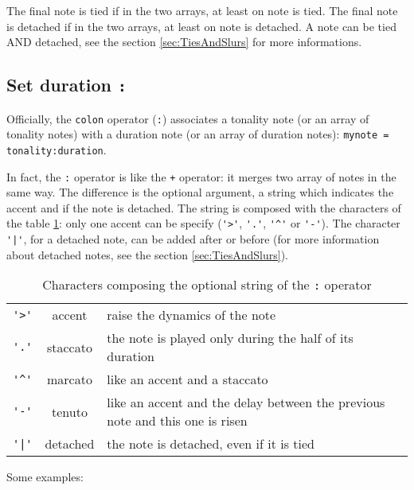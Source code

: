 \documentclass{article}
\begin{document}
The final note is tied if in the two arrays, at least on note is tied. The final note is detached if in the two arrays, at least on note is detached. A note can be tied AND detached, see the section \ref{sec:TiesAndSlurs} for more informations.

\subsection{Set duration \lstinline!:!}
\label{sec:SetDuration}

Officially, the \lstinline!colon! operator (\lstinline!:!) associates a tonality note (or an array of tonality notes) with a duration note (or an array of duration notes): \lstinline!mynote = tonality:duration!.

In fact, the \lstinline!:! operator is like the \lstinline!+! operator: it merges two array of notes in the same way. The difference is the optional argument, a string which indicates the accent and if the note is detached. The string is composed with the characters of the table \ref{table:charsOfColon}: only one accent can be specify (\lstinline!'>'!, \lstinline!'.'!, \lstinline!'^'! or \lstinline!'-'!). The character \lstinline!'|'!, for a detached note, can be added after or before (for more information about detached notes, see the section \ref{sec:TiesAndSlurs}).

\begin{table}
	\center
\begin{tabular}{ccp{7cm}}
\lstinline!'>'! & accent & raise the dynamics of the note \\
\lstinline!'.'! & staccato & the note is played only during the half of its duration \\
\lstinline!'^'! & marcato & like an accent and a staccato \\
\lstinline!'-'! & tenuto & like an accent and the delay between the previous note and this one is risen \\
\lstinline!'|'! & detached & the note is detached, even if it is tied
\end{tabular}
\caption{Characters composing the optional string of the \lstinline!:! operator}
\label{table:charsOfColon}
\end{table}

Some examples: \\
\end{document}
